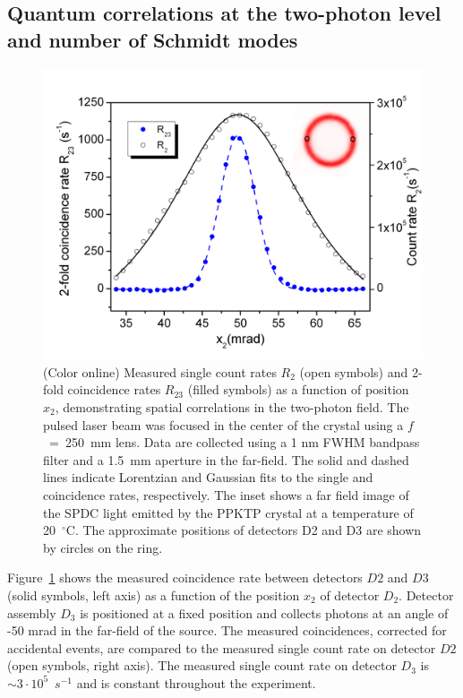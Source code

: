 
\subsection{Quantum correlations at the two-photon level and number of Schmidt modes}

\begin{figure}[tbp]
\centering \includegraphics[width=120mm]{Fig2.png}
\caption{(Color online) Measured single count rates $R_2$ (open symbols) and 2-fold coincidence rates $R_{23}$ (filled symbols) as a function of position $x_2$, demonstrating spatial correlations in the two-photon field. The pulsed laser beam was focused in the center of the crystal using a $f$~=~250~mm lens. Data are collected using a 1 nm FWHM bandpass filter and a 1.5~mm aperture in the far-field. The solid and dashed lines indicate Lorentzian and Gaussian fits to the single and coincidence rates, respectively. The inset shows a far field image of the SPDC light emitted by the PPKTP crystal at a temperature of 20~$^\circ$C. The approximate positions of detectors D2 and D3 are shown by circles on the ring.} \label{Fig:2photons}
\end{figure}

Figure~\ref{Fig:2photons} shows the measured coincidence rate between detectors $D2$ and $D3$ (solid symbols, left axis) as a function of the position $x_2$ of detector $D_2$. Detector assembly $D_3$ is positioned at a fixed position and collects photons at an angle of -50 mrad in the far-field of the source. The measured coincidences, corrected for accidental events, are compared to the measured single count rate on detector $D2$ (open symbols, right axis). The measured single count rate on detector $D_3$ is $\sim3\cdot10^{5}$~$s^{-1}$ and is constant throughout the experiment.

